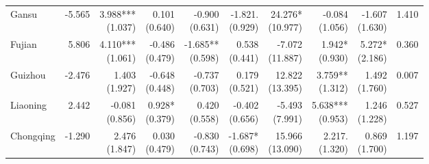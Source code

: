 \documentclass[12pt]{article}
\begin{document}
\begin{landscape}
\begin{small}
\begin{longtable}{lrrrrrrrrr}
    Gansu & -5.565 & \makecell[r]{3.988***\\(1.037)} & \makecell[r]{0.101\\(0.640)} & \makecell[r]{-0.900\\(0.631)} & \makecell[r]{-1.821.\\(0.929)} & \makecell[r]{24.276*\\(10.977)} & \makecell[r]{-0.084\\(1.056)} & \makecell[r]{-1.607\\(1.630)} & 1.410 \\
    Fujian & 5.806 & \makecell[r]{4.110***\\(1.061)} & \makecell[r]{-0.486\\(0.479)} & \makecell[r]{-1.685**\\(0.598)} & \makecell[r]{0.538\\(0.441)} & \makecell[r]{-7.072\\(11.887)} & \makecell[r]{1.942*\\(0.930)} & \makecell[r]{5.272*\\(2.186)} & 0.360 \\
    Guizhou & -2.476 & \makecell[r]{1.403\\(1.927)} & \makecell[r]{-0.648\\(0.448)} & \makecell[r]{-0.737\\(0.703)} & \makecell[r]{0.179\\(0.521)} & \makecell[r]{12.822\\(13.395)} & \makecell[r]{3.759**\\(1.312)} & \makecell[r]{1.492\\(1.760)} & 0.007 \\
    Liaoning & 2.442 & \makecell[r]{-0.081\\(0.856)} & \makecell[r]{0.928*\\(0.379)} & \makecell[r]{0.420\\(0.558)} & \makecell[r]{-0.402\\(0.656)} & \makecell[r]{-5.493\\(7.991)} & \makecell[r]{5.638***\\(0.953)} & \makecell[r]{1.246\\(1.228)} & 0.527 \\
    Chongqing & -1.290 & \makecell[r]{2.476\\(1.847)} & \makecell[r]{0.030\\(0.479)} & \makecell[r]{-0.830\\(0.743)} & \makecell[r]{-1.687*\\(0.698)} & \makecell[r]{15.966\\(13.090)} & \makecell[r]{2.217.\\(1.320)} & \makecell[r]{0.869\\(1.700)} & 1.197 \\

\end{longtable}
\end{small}
\end{landscape}
\end{document}
